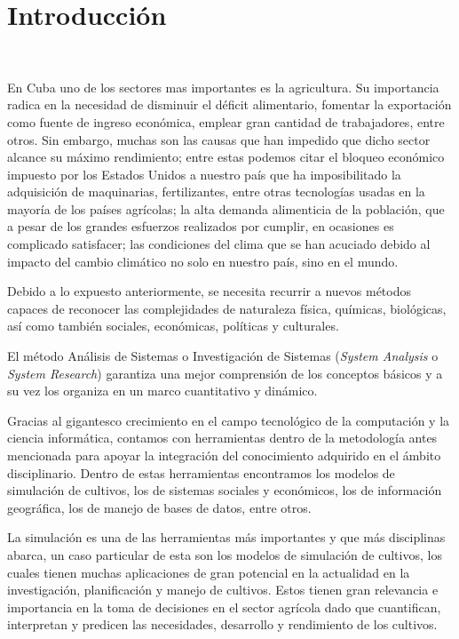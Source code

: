 \chapter*{Introducción}\label{chapter:introduction}
\

En Cuba uno de los sectores mas importantes es la agricultura. Su importancia radica en la necesidad de disminuir el déficit alimentario, fomentar la exportación como fuente de ingreso económica, emplear gran cantidad de trabajadores, entre otros. Sin embargo, muchas son las causas que han impedido que dicho sector alcance su máximo rendimiento; entre estas podemos citar el bloqueo económico impuesto por los Estados Unidos a nuestro país que ha imposibilitado la adquisición de maquinarias, fertilizantes, entre otras tecnologías usadas en la mayoría de los países agrícolas; la alta demanda alimenticia de la población, que a pesar de los grandes esfuerzos realizados por cumplir, en ocasiones es complicado satisfacer; las condiciones del clima que se han acuciado debido al impacto del cambio climático no solo en nuestro país, sino en el mundo.

Debido a lo expuesto anteriormente, se necesita recurrir a nuevos métodos capaces de reconocer las complejidades de naturaleza física, químicas, biológicas, así como también sociales, económicas, políticas y culturales.

El método Análisis de Sistemas o Investigación de Sistemas (\textit{System Analysis} o \textit{System Research}) garantiza una mejor comprensión de los conceptos básicos y a su vez los organiza en un marco cuantitativo y dinámico.

Gracias al gigantesco crecimiento en el campo tecnológico de la computación y la ciencia informática, contamos con herramientas dentro de la metodología antes mencionada para apoyar la integración del conocimiento adquirido en el ámbito disciplinario. Dentro de estas herramientas encontramos los modelos de simulación de cultivos, los de sistemas sociales y económicos, los de información geográfica, los de manejo de bases de datos, entre otros.

La simulación es una de las herramientas más importantes y que más disciplinas abarca, un caso particular de esta son los modelos de simulación de cultivos, los cuales tienen muchas aplicaciones de gran potencial en la actualidad en la investigación, planificación y manejo de cultivos. Estos tienen gran relevancia e importancia en la toma de decisiones en el sector agrícola dado que cuantifican, interpretan y predicen las necesidades, desarrollo y rendimiento de los cultivos.

